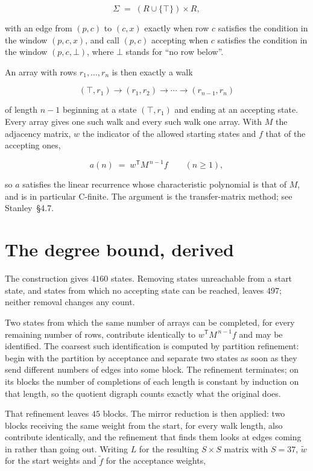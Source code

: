 \documentclass[11pt]{article}
\theoremstyle{definition}
\begin{document}
\[\Sigma \;=\; (R \cup \{\top\}) \times R,\]

with an edge from $(p,c)$ to $(c,x)$ exactly when row $c$ satisfies the condition in the window $(p,c,x)$, and call $(p,c)$ accepting when $c$ satisfies the condition in the window $(p,c,\bot)$, where $\bot$ stands for ``no row below''.

An array with rows $r_1,\dots,r_n$ is then exactly a walk

\[(\top,r_1) \to (r_1,r_2) \to \cdots \to (r_{n-1},r_n)\]

of length $n-1$ beginning at a state $(\top,r_1)$ and ending at an accepting state. Every array gives one such walk and every such walk one array. With $M$ the adjacency matrix, $w$ the indicator of the allowed starting states and $f$ that of the accepting ones,

\[a(n) \;=\; w^{\mathsf T} M^{\,n-1} f \qquad (n \ge 1),\]

so $a$ satisfies the linear recurrence whose characteristic polynomial is that of $M$, and is in particular C-finite. The argument is the transfer-matrix method; see Stanley~\S4.7.

\section{The degree bound, derived}

The construction gives $4160$ states. Removing states unreachable from a start state, and states from which no accepting state can be reached, leaves $497$; neither removal changes any count.

Two states from which the same number of arrays can be completed, for every remaining number of rows, contribute identically to $w^{\mathsf T}M^{\,n-1}f$ and may be identified. The coarsest such identification is computed by partition refinement: begin with the partition by acceptance and separate two states as soon as they send different numbers of edges into some block. The refinement terminates; on its blocks the number of completions of each length is constant by induction on that length, so the quotient digraph counts exactly what the original does.

That refinement leaves $45$ blocks. The mirror reduction is then applied: two blocks receiving the same weight from the start, for every walk length, also contribute identically, and the refinement that finds them looks at edges coming in rather than going out. Writing $L$ for the resulting $S \times S$ matrix with $S = 37$, $\tilde w$ for the start weights and $\tilde f$ for the acceptance weights,
\end{document}
